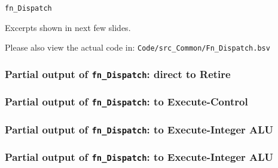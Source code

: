 \begin{frame}

\begin{center}
  {\LARGE\tt fn\_Dispatch}

  \vspace{5ex}

  Excerpts shown in next few slides.

  Please also view the actual code in:
  {\tt Code/src\_Common/Fn\_Dispatch.bsv}

\end{center}

\end{frame}


\begin{frame}[fragile]
\frametitle{Partial output of {\tt fn\_Dispatch}: direct to Retire}

\footnotesize


\end{frame}


\begin{frame}[fragile]
\frametitle{Partial output of {\tt fn\_Dispatch}: to Execute-Control}

\footnotesize


\end{frame}


\begin{frame}[fragile]
\frametitle{Partial output of {\tt fn\_Dispatch}: to Execute-Integer ALU}

\footnotesize


\end{frame}


\begin{frame}[fragile]
\frametitle{Partial output of {\tt fn\_Dispatch}: to Execute-Integer ALU}

\footnotesize


\end{frame}

